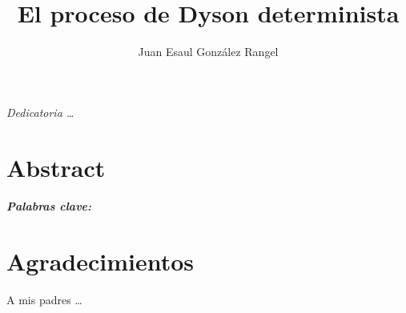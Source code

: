 \documentclass[letterpaper,11pt,twoside]{book}  %
\author{Juan Esaul González Rangel}
\title{El proceso de Dyson determinista}
\begin{document}
\maketitle  %

\thispagestyle{empty}  %

\frontmatter

\chapter*{}
\begin{flushright}%
  \emph{Dedicatoria \ldots}
  \thispagestyle{empty}
\end{flushright}



\chapter*{Abstract}



\paragraph{Palabras clave:} 

\chapter*{Agradecimientos}

A mis padres \ldots

\tableofcontents


\mainmatter
















%

\printbibliography[heading=bibintoc]

\appendix



\backmatter
\end{document}

